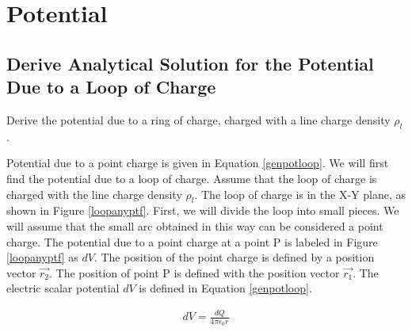 \documentclass{ximera}
\begin{document}
\section{Potential}

\subsection{Derive Analytical Solution for the Potential  Due to a Loop of Charge }

Derive the potential due to a ring of charge, charged with a line charge density $\rho_l$. 


Potential due to a point charge is given in Equation \ref{genpotloop}. We will first find the potential due to a loop of charge. Assume that the loop of charge is charged with the line charge density $\rho_l$. The loop of charge is in the X-Y plane, as shown in Figure \ref{loopanyptf}.  First, we will divide the loop into small pieces. We will assume that the small arc obtained in this way can be considered a point charge. The potential due to a point charge at a point P is labeled in Figure \ref{loopanyptf} as $dV$.  The position of the point charge is defined by a position vector $\vec{r_2}$. The position of point P is defined with the position vector  $\vec{r_1}$. The electric scalar potential $dV$ is defined in  Equation  \ref{genpotloop}.


\begin{eqnarray}
dV=\frac{dQ}{4 \pi \epsilon_{0} {r}}  \label{genpotloop}
\end{eqnarray}
\end{document}
